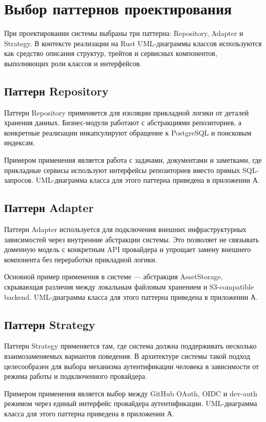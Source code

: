 \section{Выбор паттернов проектирования}
\headingtextsep

При проектировании системы выбраны три паттерна: Repository, Adapter и Strategy. В контексте реализации на Rust UML-диаграммы классов используются как средство описания структур, трейтов и сервисных компонентов, выполняющих роли классов и интерфейсов.

\textheadingsep
\subsection{Паттерн Repository}
\headingtextsep

Паттерн Repository применяется для изоляции прикладной логики от деталей хранения данных. Бизнес-модули работают с абстракциями репозиториев, а конкретные реализации инкапсулируют обращение к PostgreSQL и поисковым индексам.

Примером применения является работа с задачами, документами и заметками, где прикладные сервисы используют интерфейсы репозиториев вместо прямых SQL-запросов. UML-диаграмма класса для этого паттерна приведена в приложении А.

\textheadingsep
\subsection{Паттерн Adapter}
\headingtextsep

Паттерн Adapter используется для подключения внешних инфраструктурных зависимостей через внутренние абстракции системы. Это позволяет не связывать доменную модель с конкретным API провайдера и упрощает замену внешнего компонента без переработки прикладной логики.

Основной пример применения в системе --- абстракция AssetStorage, скрывающая различия между локальным файловым хранением и S3-compatible backend. UML-диаграмма класса для этого паттерна приведена в приложении А.

\textheadingsep
\subsection{Паттерн Strategy}
\headingtextsep

Паттерн Strategy применяется там, где система должна поддерживать несколько взаимозаменяемых вариантов поведения. В архитектуре системы такой подход целесообразен для выбора механизма аутентификации человека в зависимости от режима работы и подключенного провайдера.

Примером применения является выбор между GitHub OAuth, OIDC и dev-auth режимом через единый интерфейс провайдера аутентификации. UML-диаграмма класса для этого паттерна приведена в приложении А.
